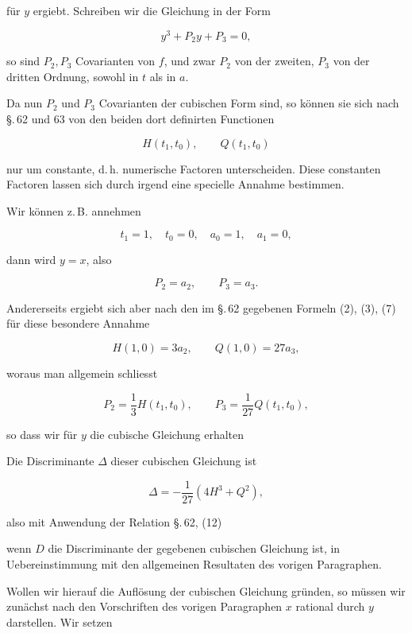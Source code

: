 

für $y$ ergiebt. Schreiben wir die Gleichung in der Form

\[ y^3 + P_2y + P_3 = 0, \]

so sind $P_2, P_3$ Covarianten von $f$, und zwar $P_2$ von der zweiten, $P_3$ von der dritten Ordnung, sowohl in $t$ als in $a$.

Da nun $P_2$ und $P_3$ Covarianten der cubischen Form sind, so können sie sich nach \S.\,62 und 63 von den beiden dort definirten Functionen

\[ H(t_1,t_0), \qquad Q(t_1,t_0) \]

nur um constante, d.\,h. numerische Factoren unterscheiden. Diese constanten Factoren lassen sich durch irgend eine specielle Annahme bestimmen.

Wir können z.\,B. annehmen

\[ t_1 = 1, \quad t_0 = 0, \quad a_0 = 1, \quad a_1 = 0, \]

dann wird $y=x$, also

\[ P_2 = a_2, \qquad P_3 = a_3. \]

Andererseits ergiebt sich aber nach den im \S.\,62 gegebenen Formeln (2), (3), (7) für diese besondere Annahme

\[ H(1,0) = 3a_2, \qquad Q(1,0) = 27a_3, \]

woraus man allgemein schliesst

\[ P_2 = \frac{1}{3}H(t_1,t_0), \qquad P_3 = \frac{1}{27}Q(t_1,t_0), \]

so dass wir für $y$ die cubische Gleichung erhalten


Die Discriminante $\Delta$ dieser cubischen Gleichung ist

\[ \Delta = -\frac{1}{27}(4H^3 + Q^2), \]

also mit Anwendung der Relation \S.\,62, (12)



wenn $D$ die Discriminante der gegebenen cubischen Gleichung ist, in Uebereinstimmung mit den allgemeinen Resultaten des vorigen Paragraphen.

Wollen wir hierauf die Auflösung der cubischen Gleichung gründen, so müssen wir zunächst nach den Vorschriften des vorigen Paragraphen $x$ rational durch $y$ darstellen. Wir setzen

